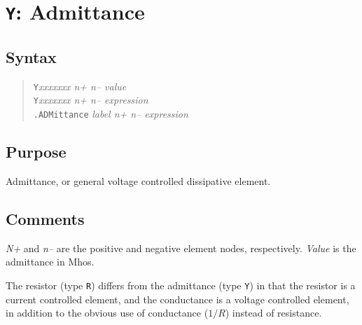 %
%
%
%
\section{{\tt Y}: Admittance}
\subsection{Syntax}
\begin{verse}
{\tt Y}{\it xxxxxxx n+ n-- value}\\
{\tt Y}{\it xxxxxxx n+ n-- expression}\\
{\tt .ADMittance} {\it label n+ n-- expression}
\end{verse}
\subsection{Purpose}

Admittance, or general voltage controlled dissipative element.
\subsection{Comments}

{\it N+} and {\it n--} are the positive and negative element nodes,
respectively.  {\it Value} is the admittance in Mhos.

The resistor (type {\tt R}) differs from the admittance (type {\tt Y}) in
that the resistor is a current controlled element, and the conductance is a
voltage controlled element, in addition to the obvious use of conductance
($1/R$) instead of resistance.
